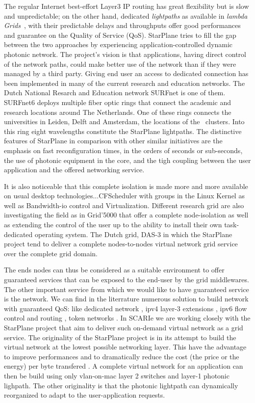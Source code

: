 The regular Internet best-effort Layer3 IP routing has great
flexibility but is slow and unpredictable; on the other hand,
dedicated \textit{lightpaths} as available in \textit{lambda
  Grids}~\cite{eslea-2007}, with their predictable delays and
throughputs offer good performances and guarantee on the Quality of
Service (QoS). StarPlane tries to fill the gap between the two
approaches by experiencing application-controlled dynamic photonic
network. The project's vision is that applications, having direct
control of the network paths, could make better use of the network
than if they were managed by a third party. Giving end user an access
to dedicated connection has been implemented in many of the current
research and education networks. The Dutch National Resarch and
Education network SURFnet is one of them. SURFnet6 deploys multiple
fiber optic rings that connect the academic and research locations
around The Netherlands. One of these rings connects the universities
in Leiden, Delft and Amsterdam, the locations of the \ clusters.
Into this ring eight wavelengths constitute the StarPlane lightpaths.
The distinctive features of StarPlane in comparison with other similar
initiatives are the emphasis on fast reconfiguration times, in the
orders of seconds or sub-seconds, the use of photonic equipment in the
core, and the tigh coupling between the user application and the
offered networking service.


It is also noticeable that this complete isolation is made more and 
more available on usual desktop technologies...CFScheduler with groups 
in the Linux Kernel as well as Bandwidth-io control and Virtualization.
Different research grid are also investigating the field as in 
Grid'5000 that offer a complete node-isolation as well as extending the 
control of the user up to the ability to install their own task-dedicated 
operating system. The Dutch grid, DAS-3 in which the StarPlane project tend
to deliver a complete nodes-to-nodes virtual network grid service over the 
complete grid domain. 

The ends nodes can thus be considered as a suitable environment to offer
guaranteed services that can be exposed to the end-user by the grid 
middlewares. The other important service from which we would like to have 
guaranteed service is the network. We can find in the literrature numerous 
solution to build network with guaranteed QoS: like 
dedicated network \cite{blahblah}, ipv4 layer-3 extensions \cite{}, ipv6 flow
control and routing \cite{}, token networks \cite{}. In SCARIe we are working 
closely with the StarPlane project that aim to deliver such on-demand 
virtual network as a grid service. The originality of the StarPlane project 
is in its attempt to build the virtual network at the lowest possible networking 
layer. This have the advantage to improve performances and to dramatically 
reduce the cost (the price or the energy) per byte transfered \cite{}. 
A complete virtual network for an application can then be build using only
vlan-on-mac layer 2 switches and layer-1 photonic lighpath. The other originality 
is that the photonic lightpath can dynamically reorganized to adapt to the
user-application requests. 

